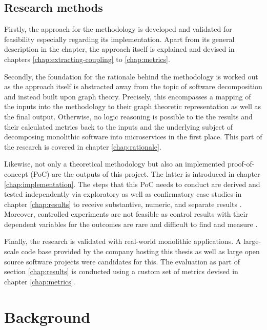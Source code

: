 \documentclass[12pt,a4paper]{report}
\begin{document}
\section{Research methods}

Firstly, the approach for the methodology is developed and validated
for feasibility especially regarding its implementation.
Apart from its general description in the \textit{} chapter,
the approach itself is explained and devised in chapters
\ref{chap:extracting-coupling} to \ref{chap:metrics}.

Secondly, the foundation for the rationale behind the methodology is worked out
as the approach itself is abstracted away from the topic of
software decomposition and instead built upon graph theory.
Precisely, this encompasses a mapping of the inputs into the methodology to
their graph theoretic representation as well as the final output.
Otherwise, no logic reasoning is possible to tie the results and
their calculated metrics back to the inputs and the underlying subject
of decomposing monolithic software into microservices in the first place.
This part of the research is covered in chapter \ref{chap:rationale}.

Likewise, not only a theoretical methodology but also an implemented
proof-of-concept (PoC) are the outputs of this project.
The latter is introduced in chapter \ref{chap:implementation}.
The steps that this PoC needs to conduct are derived and tested
independently via exploratory as well as confirmatory case studies
in chapter \ref{chap:results} to receive substantive, numeric,
and separate results \cite{easterbrook2008selecting}.
Moreover, controlled experiments are not feasible as control results
with their dependent variables for the outcomes are rare and difficult
to find and measure \cite{easterbrook2008selecting}.

Finally, the research is validated with real-world monolithic applications.
A large-scale code base provided by the company hosting this thesis as well as
large open source software projects were candidates for this.
The evaluation as part of section \ref{chap:results} is conducted using
a custom set of metrics devised in chapter \ref{chap:metrics}.




\chapter{Background} \label{chap:background}
\end{document}
